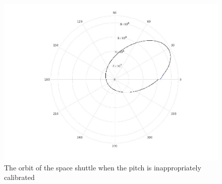 \documentclass{article}
\begin{document}
\begin{figure}
	\includegraphics[width = \linewidth]{space_shuttle_to_steep.jpg}
	\caption{The orbit of the space shuttle when the pitch is inappropriately calibrated}
	\label{eccentric}
\end{figure}
\end{document}
